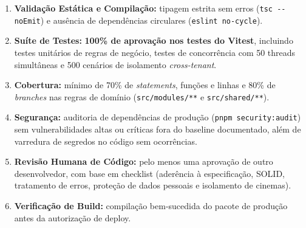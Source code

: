 \begin{enumerate}
\item \textbf{Validação Estática e Compilação:} tipagem estrita sem erros (\texttt{tsc \allowbreak\hspace{0pt plus 1pt}-\allowbreak\hspace{0pt plus 1pt}-\allowbreak\hspace{0pt plus 1pt}noEmit}) e ausência de dependências circulares (\texttt{eslint \allowbreak\hspace{0pt plus 1pt}no-\allowbreak\hspace{0pt plus 1pt}cycle}).
\item \textbf{Suíte de Testes:} \textbf{100\% de aprovação nos testes do Vitest}, incluindo testes unitários de regras de negócio, testes de concorrência com 50 threads simultâneas e 500 cenários de isolamento \emph{cross-tenant}.
\item \textbf{Cobertura:} mínimo de 70\% de \emph{statements}, funções e linhas e 80\% de \emph{branches} nas regras de domínio (\texttt{src/\allowbreak\hspace{0pt plus 1pt}modules/\allowbreak\hspace{0pt plus 1pt}**} e \texttt{src/\allowbreak\hspace{0pt plus 1pt}shared/\allowbreak\hspace{0pt plus 1pt}**}).
\item \textbf{Segurança:} auditoria de dependências de produção (\texttt{pnpm \allowbreak\hspace{0pt plus 1pt}security:audit}) sem vulnerabilidades altas ou críticas fora do baseline documentado, além de varredura de segredos no código sem ocorrências.
\item \textbf{Revisão Humana de Código:} pelo menos uma aprovação de outro desenvolvedor, com base em checklist (aderência à especificação, SOLID, tratamento de erros, proteção de dados pessoais e isolamento de cinemas).
\item \textbf{Verificação de Build:} compilação bem-sucedida do pacote de produção antes da autorização de deploy.
\end{enumerate}


